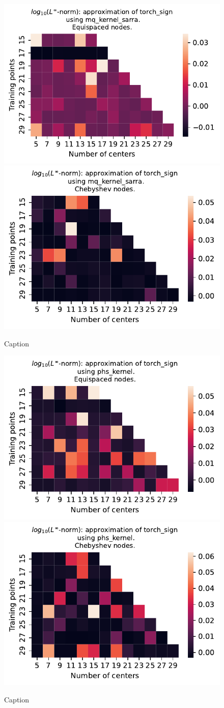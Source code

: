 \documentclass[12pt]{report} %
\begin{document}
\begin{figure}[ht]
  \centering

  \includegraphics[width=.49\textwidth]{imagenes/experiments/1d/variational/torch_sign-Kmq_kernel_sarra-Equi.pdf}
  \includegraphics[width=.49\textwidth]{imagenes/experiments/1d/variational/torch_sign-Kmq_kernel_sarra-Cheb.pdf}
  \caption{Caption}
  \label{fig:torch-sign-sarra}
\end{figure}


\begin{figure}[ht]
  \centering
  \includegraphics[width=.49\textwidth]{imagenes/experiments/1d/variational/torch_sign-Kphs_kernel-Equi.pdf}
  \includegraphics[width=.49\textwidth]{imagenes/experiments/1d/variational/torch_sign-Kphs_kernel-Cheb.pdf}
  \caption{Caption}
  \label{fig:torch-sign-phs}
\end{figure}
\end{document}
